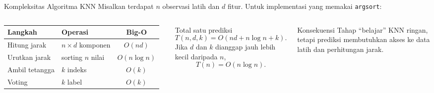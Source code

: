 \documentclass[aspectratio=169,11pt]{beamer}
\begin{document}
\begin{frame}{Kompleksitas Algoritma KNN}
\small
Misalkan terdapat $n$ observasi latih dan $d$ fitur. Untuk implementasi yang memakai \texttt{argsort}:
\begin{columns}[T]
\centering
\begin{tabular}{l l c}
\toprule
Langkah & Operasi & Big-O \\
\midrule
Hitung jarak & $n\times d$ komponen & $O(nd)$ \\
Urutkan jarak & sorting $n$ nilai & $O(n\log n)$ \\
Ambil tetangga & $k$ indeks & $O(k)$ \\
Voting & $k$ label & $O(k)$ \\
\bottomrule
\end{tabular}
\begin{block}{Total satu prediksi}
\[
T(n,d,k)=O(nd+n\log n+k).
\]
Jika $d$ dan $k$ dianggap jauh lebih kecil daripada $n$,
\[
T(n)=O(n\log n).
\]
\end{block}
\begin{alertblock}{Konsekuensi}
\footnotesize
Tahap ``belajar'' KNN ringan, tetapi prediksi membutuhkan akses ke data latih dan perhitungan jarak.
\end{alertblock}
\end{columns}
\end{frame}
\end{document}
